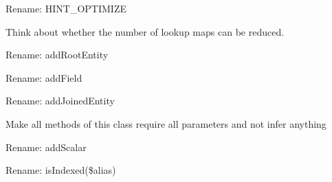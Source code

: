 \begin{DoxyRefList}
Rename\+: HINT\+\_\+\+OPTIMIZE  
\item[Class \mbox{\hyperlink{class_doctrine_1_1_o_r_m_1_1_query_1_1_result_set_mapping}{Result\+Set\+Mapping}} ]\label{todo__todo000028}%
%
Think about whether the number of lookup maps can be reduced.  
\item[Global \mbox{\hyperlink{class_doctrine_1_1_o_r_m_1_1_query_1_1_result_set_mapping_a22618cb52fe4012c59b7f41a9a9ca755}{Result\+Set\+Mapping\+::add\+Entity\+Result}} (\$class, \$alias, \$result\+Alias=null)]\label{todo__todo000029}%
%
Rename\+: add\+Root\+Entity  
\item[Global \mbox{\hyperlink{class_doctrine_1_1_o_r_m_1_1_query_1_1_result_set_mapping_a0ab2b41f514b80b73bd30ebecd6f59a4}{Result\+Set\+Mapping\+::add\+Field\+Result}} (\$alias, \$column\+Name, \$field\+Name, \$declaring\+Class=null)]\label{todo__todo000033}%
%
Rename\+: add\+Field  
\item[Global \mbox{\hyperlink{class_doctrine_1_1_o_r_m_1_1_query_1_1_result_set_mapping_a0c6f12f5bb7a91a5eb85fd5c211a47c4}{Result\+Set\+Mapping\+::add\+Joined\+Entity\+Result}} (\$class, \$alias, \$parent\+Alias, \$relation)]\label{todo__todo000034}%
%
Rename\+: add\+Joined\+Entity  
\item[Global \mbox{\hyperlink{class_doctrine_1_1_o_r_m_1_1_query_1_1_result_set_mapping_a76759c8df80a348acefac3d64a8d21ee}{Result\+Set\+Mapping\+::add\+Meta\+Result}} (\$alias, \$column\+Name, \$field\+Name, \$is\+Identifier\+Column=false, \$type=null)]\label{todo__todo000037}%
%
Make all methods of this class require all parameters and not infer anything  
\item[Global \mbox{\hyperlink{class_doctrine_1_1_o_r_m_1_1_query_1_1_result_set_mapping_a87abf8d51216a8c7e93192c8e5912cc2}{Result\+Set\+Mapping\+::add\+Scalar\+Result}} (\$column\+Name, \$alias, \$type=\textquotesingle{}string\textquotesingle{})]\label{todo__todo000035}%
%
Rename\+: add\+Scalar  
\item[Global \mbox{\hyperlink{class_doctrine_1_1_o_r_m_1_1_query_1_1_result_set_mapping_a1621c4811504feea9ea87d89e5672814}{Result\+Set\+Mapping\+::has\+Index\+By}} (\$alias)]\label{todo__todo000031}%
%
Rename\+: is\+Indexed(\$alias)  
\item[Global \mbox{\hyperlink{class_doctrine_1_1_o_r_m_1_1_query_1_1_result_set_mapping_a3601f42bbb9184bb2dd3a1c58c1978e2}{Result\+Set\+Mapping\+::is\+Field\+Result}} (\$column\+Name)]\label{todo__todo000032}%

\end{DoxyRefList}
